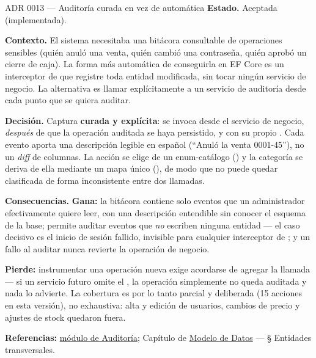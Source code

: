 \begin{cajaADR}{ADR 0013 --- Auditoría curada en vez de automática}
\textbf{Estado.} Aceptada (implementada).

\textbf{Contexto.} El sistema necesitaba una bitácora consultable de operaciones sensibles (quién anuló una venta, quién cambió una contraseña, quién aprobó un cierre de caja). La forma más automática de conseguirla en EF Core es un interceptor de  que registre toda entidad modificada, sin tocar ningún servicio de negocio. La alternativa es llamar explícitamente a un servicio de auditoría desde cada punto que se quiera auditar.

\textbf{Decisión.} Captura \textbf{curada y explícita}: \allowbreak {}\allowbreak {}\allowbreak {}\allowbreak {} se invoca desde el servicio de negocio, \emph{después} de que la operación auditada se haya persistido, y con su propio . Cada evento aporta una descripción legible en español (``Anuló la venta 0001-45''), no un \emph{diff} de columnas. La acción se elige de un enum-catálogo () y la categoría se deriva de ella mediante un mapa único (), de modo que no puede quedar clasificada de forma inconsistente entre dos llamadas.

\textbf{Consecuencias.} \textbf{Gana:} la bitácora contiene solo eventos que un administrador efectivamente quiere leer, con una descripción entendible sin conocer el esquema de la base; permite auditar eventos que \emph{no} escriben ninguna entidad --- el caso decisivo es el inicio de sesión fallido, invisible para cualquier interceptor de ; y un fallo al auditar nunca revierte la operación de negocio.

\textbf{Pierde:} instrumentar una operación nueva exige acordarse de agregar la llamada --- si un servicio futuro omite el , la operación simplemente no queda auditada y nada lo advierte. La cobertura es por lo tanto parcial y deliberada (15 acciones en esta versión), no exhaustiva: alta y edición de usuarios, cambios de precio y ajustes de stock quedaron fuera.
\end{cajaADR}

\textbf{Referencias:} \hyperref[mod:16-auditoria]{módulo de Auditoría}; Capítulo de \hyperref[sec:modelo-datos]{Modelo de Datos} --- § Entidades transversales.
